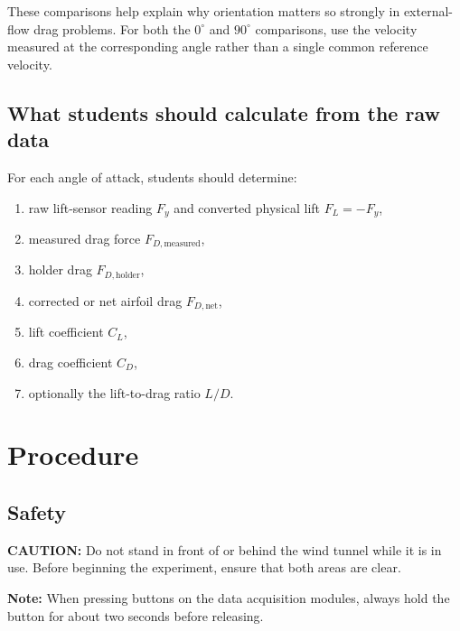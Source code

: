 \documentclass[12pt,letterpaper]{article}
\begin{document}
These comparisons help explain why orientation matters so strongly in external-flow drag problems. For both the \(0^\circ\) and \(90^\circ\) comparisons, use the velocity measured at the corresponding angle rather than a single common reference velocity.

\subsection{What students should calculate from the raw data}
For each angle of attack, students should determine:
\begin{enumerate}[leftmargin=*, label=\arabic*.]
    \item raw lift-sensor reading \(F_y\) and converted physical lift \(F_L=-F_y\),
    \item measured drag force \(F_{D,\text{measured}}\),
    \item holder drag \(F_{D,\text{holder}}\),
    \item corrected or net airfoil drag \(F_{D,\text{net}}\),
    \item lift coefficient \(C_L\),
    \item drag coefficient \(C_D\),
    \item optionally the lift-to-drag ratio \(L/D\).
\end{enumerate}

\section{Procedure}

\subsection*{Safety}
\textbf{CAUTION:} Do not stand in front of or behind the wind tunnel while it is in use. Before beginning the experiment, ensure that both areas are clear.

\textbf{Note:} When pressing buttons on the data acquisition modules, always hold the button for about two seconds before releasing.
\end{document}

